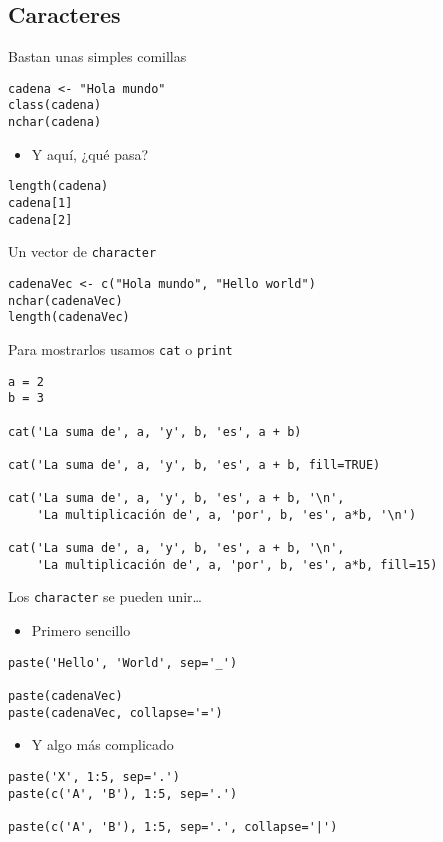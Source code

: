 \documentclass[xcolor={usenames,svgnames,dvipsnames}]{beamer}
\begin{document}
\subsection{Caracteres}
\label{sec-5-3}

\begin{frame}[fragile,label=sec-5-3-1]{Bastan unas simples comillas}
 \lstset{language=R,numbers=none}
\begin{lstlisting}
cadena <- "Hola mundo"
class(cadena)
nchar(cadena)
\end{lstlisting}

\begin{itemize}
\item Y aquí, ¿qué pasa?
\end{itemize}
\lstset{language=R,numbers=none}
\begin{lstlisting}
length(cadena)
cadena[1]
cadena[2]
\end{lstlisting}
\end{frame}
\begin{frame}[fragile,label=sec-5-3-2]{Un vector de \texttt{character}}
 \lstset{language=R,numbers=none}
\begin{lstlisting}
cadenaVec <- c("Hola mundo", "Hello world")
nchar(cadenaVec)
length(cadenaVec)
\end{lstlisting}
\end{frame}
\begin{frame}[fragile,label=sec-5-3-3]{Para mostrarlos usamos \texttt{cat} o \texttt{print}}
 \lstset{language=R,numbers=none}
\begin{lstlisting}
a = 2
b = 3

cat('La suma de', a, 'y', b, 'es', a + b)

cat('La suma de', a, 'y', b, 'es', a + b, fill=TRUE)

cat('La suma de', a, 'y', b, 'es', a + b, '\n',
    'La multiplicación de', a, 'por', b, 'es', a*b, '\n')

cat('La suma de', a, 'y', b, 'es', a + b, '\n',
    'La multiplicación de', a, 'por', b, 'es', a*b, fill=15)
\end{lstlisting}
\end{frame}
\begin{frame}[fragile,label=sec-5-3-4]{Los \texttt{character} se pueden unir\ldots{}}
 \begin{itemize}
\item Primero sencillo
\end{itemize}
\lstset{language=R,numbers=none}
\begin{lstlisting}
paste('Hello', 'World', sep='_')

paste(cadenaVec)
paste(cadenaVec, collapse='=')
\end{lstlisting}
\begin{itemize}
\item Y algo más complicado
\end{itemize}
\lstset{language=R,numbers=none}
\begin{lstlisting}
paste('X', 1:5, sep='.')
paste(c('A', 'B'), 1:5, sep='.')

paste(c('A', 'B'), 1:5, sep='.', collapse='|')
\end{lstlisting}
\end{frame}
\end{document}
